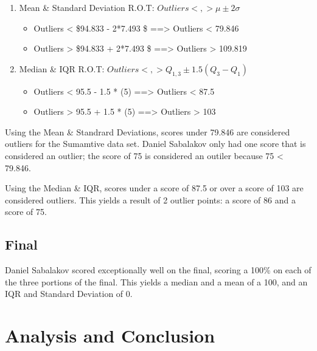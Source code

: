 \documentclass[letterpaper]{article}
\def\tightlist{}
\begin{document}
\begin{enumerate}
\def\labelenumi{\arabic{enumi}.}
\tightlist
\item
  Mean \& Standard Deviation R.O.T: \(Outliers <,> \mu \pm 2\sigma\)

  \begin{itemize}
  \tightlist
  \item
    Outliers \textless{} \$94.833 - 2*7.493 \$ ==\textgreater{} Outliers \textless{} 79.846
  \item
    Outliers \textgreater{} \$94.833 + 2*7.493 \$ ==\textgreater{} Outliers \textgreater{} 109.819
  \end{itemize}
\item
  Median \& IQR R.O.T: \(Outliers <,> Q_{1,3} \pm 1.5(Q_3-Q_1)\)

  \begin{itemize}
  \tightlist
  \item
    Outliers \textless{} 95.5 - 1.5 * (5) ==\textgreater{} Outliers \textless{} 87.5
  \item
    Outliers \textgreater{} 95.5 + 1.5 * (5) ==\textgreater{} Outliers \textgreater{} 103
  \end{itemize}
\end{enumerate}

Using the Mean \& Standrard Deviations, scores under 79.846 are considered outliers for the Sumamtive data set. Daniel Sabalakov only had one score that is considered an outlier; the score of 75 is considered an outiler because 75 \textless{} 79.846.

Using the Median \& IQR, scores under a score of 87.5 or over a score of 103 are considered outliers. This yields a result of 2 outlier points: a score of 86 and a score of 75.

\subsection*{Final}\label{final}

Daniel Sabalakov scored exceptionally well on the final, scoring a 100\% on each of the three portions of the final. This yields a median and a mean of a 100, and an IQR and Standard Deviation of 0.

\section*{Analysis and Conclusion}\label{analysis-and-conclusion}
\end{document}
